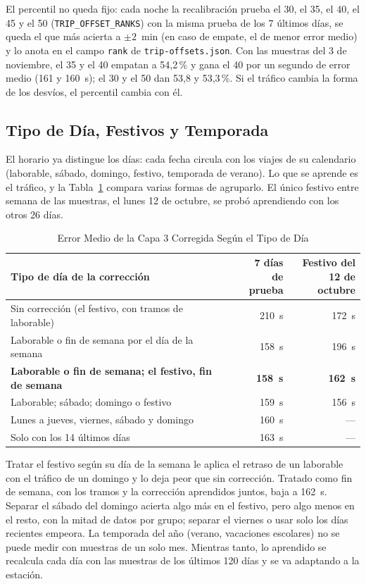 El percentil no queda fijo: cada noche la recalibración prueba el 30, el 35, el 40, el 45 y el 50
(\texttt{TRIP\_OFFSET\_RANKS}) con la misma prueba de los 7 últimos días, se queda el que más acierta a $\pm2$~min
(en caso de empate, el de menor error medio) y lo anota en el campo \texttt{rank} de \texttt{trip-offsets.json}. Con las muestras del 3
de noviembre, el 35 y el 40 empatan a 54,2\,\% y gana el 40 por un segundo de error medio (161 y 160~s); el 30 y el 50
dan 53,8 y 53,3\,\%. Si el tráfico cambia la forma de los desvíos, el percentil cambia con él.

\subsection{Tipo de Día, Festivos y Temporada}

El horario ya distingue los días: cada fecha circula con los viajes de su calendario (laborable, sábado, domingo,
festivo, temporada de verano). Lo que se aprende es el tráfico, y la Tabla~\ref{tab:tipo-dia} compara varias formas de
agruparlo. El único festivo entre semana de las muestras, el lunes 12 de octubre, se probó aprendiendo con los otros
26 días.

\begin{table}[ht]
\centering
\caption{Error Medio de la Capa 3 Corregida Según el Tipo de Día}\label{tab:tipo-dia}
\begin{tabular}{@{}lrr@{}}
\toprule
Tipo de día de la corrección & \shortstack{7 días\\de prueba} & \shortstack{Festivo del\\12 de octubre}\\
\midrule
Sin corrección (el festivo, con tramos de laborable) & 210~s & 172~s\\
Laborable o fin de semana por el día de la semana & 158~s & 196~s\\
\textbf{Laborable o fin de semana; el festivo, fin de semana} & \textbf{158~s} & \textbf{162~s}\\
Laborable; sábado; domingo o festivo & 159~s & 156~s\\
Lunes a jueves, viernes, sábado y domingo & 160~s & ---\\
Solo con los 14 últimos días & 163~s & ---\\
\bottomrule
\end{tabular}
\end{table}

Tratar el festivo según su día de la semana le aplica el retraso de un laborable con el tráfico de un domingo y lo deja
peor que sin corrección. Tratado como fin de semana, con los tramos y la corrección aprendidos juntos, baja a
162~s. Separar el sábado del domingo acierta algo más en el festivo, pero algo menos en el resto, con la mitad de datos
por grupo; separar el viernes o usar solo los días recientes empeora. La temporada del año (verano, vacaciones escolares)
no se puede medir con muestras de un solo mes. Mientras tanto, lo aprendido se recalcula cada día con las muestras de
los últimos 120 días y se va adaptando a la estación.

